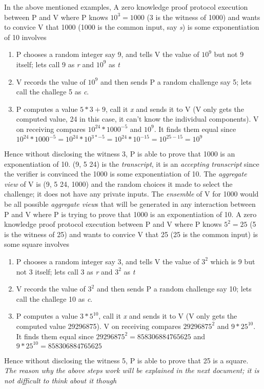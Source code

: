 \documentclass[a4paper]{article}
\begin{document}
In the above mentioned examples,
\newline
\indent  A zero knowledge proof protocol execution between P and V where P knows $10^3 = 1000$ (3 is the witness of 1000) and wants to convice V that 1000 (1000 is the common input, say \textit{s}) is some exponentiation of 10 involves 
\begin{enumerate}
  \item P chooses a random integer say 9, and tells V the value of $10^9$ but not 9 itself; lets call 9 as \textit{r} and $10^9$ as \textit{t}
  \item V records the value of $10^9$ and then sends P a random challenge say 5; lets call the challege 5 as \textit{c}.
  \item P computes a value $5*3 + 9$, call it \textit{x} and sends it to V (V only gets the computed value, 24 in this case, it can't know the individual components). V on receiving compares $10^{24}*1000^{-5}$ and $10^9$. It finds them equal since $10^{24}*1000^{-5} = 10^{24}*10^{3*-5} = 10^{24}*10^{-15} = 10^{25-15} = 10^9$
\end{enumerate}
Hence without disclosing the witness 3, P is able to prove that 1000 is an exponentiation of 10. (9, 5 24) is the \textit{transcript}, it is an \textit{accepting transcript} since the verifier is convinced the 1000 is some exponentiation of 10. The \textit{aggregate view} of V is (9, 5 24, 1000) and the random choices it made to select the challenge; it does not have any private inputs. The \textit{ensemble} of V for 1000 would be all possible \textit{aggregate view}s that will be generated in any interaction between P and V where P is trying to prove that 1000 is an exponentiation of 10.
\newline
\indent  A zero knowledge proof protocol execution between P and V where P knows $5^2 = 25$ (5 is the witness of 25) and wants to convice V that 25 (25 is the common input) is some square involves 
\begin{enumerate}
  \item P chooses a random integer say 3, and tells V the value of $3^2$ which is 9 but not 3 itself; lets call 3 as \textit{r} and $3^2$ as \textit{t}
  \item V records the value of $3^2$ and then sends P a random challenge say 10; lets call the challege 10 as \textit{c}.
  \item P computes a value $3*5^{10}$, call it \textit{x} and sends it to V (V only gets the computed value 29296875). V on receiving compares $29296875^2$ and $9*25^{10}$. It finds them equal since $29296875^2 = 858306884765625$ and $9*25^{10} = 858306884765625$
\end{enumerate}
Hence without disclosing the witness 5, P is able to prove that 25 is a square. \textit{The reason why the above steps work will be explained in the next document; it is not difficult to think about it though}
\newline
\end{document}
